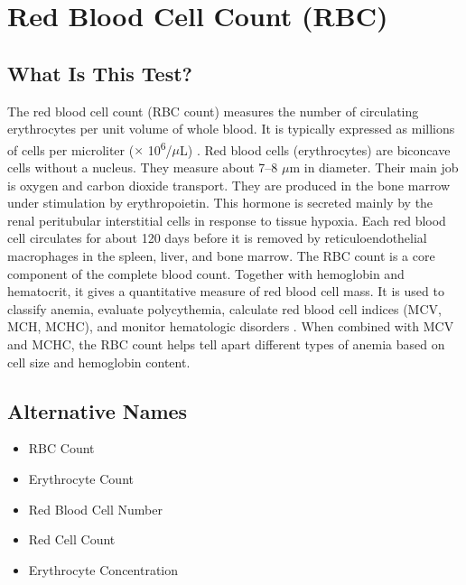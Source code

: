 \chapter{Red Blood Cell Count (RBC)}

\section*{What Is This Test?}
The red blood cell count (RBC count) measures the number of circulating erythrocytes per unit volume of whole blood. It is typically expressed as millions of cells per microliter ($\times$ 10\textsuperscript{6}/$\mu$L) \cite{tierney2023current}. Red blood cells (erythrocytes) are biconcave cells without a nucleus. They measure about 7--8 $\mu$m in diameter. Their main job is oxygen and carbon dioxide transport. They are produced in the bone marrow under stimulation by erythropoietin. This hormone is secreted mainly by the renal peritubular interstitial cells in response to tissue hypoxia. Each red blood cell circulates for about 120 days before it is removed by reticuloendothelial macrophages in the spleen, liver, and bone marrow. The RBC count is a core component of the complete blood count. Together with hemoglobin and hematocrit, it gives a quantitative measure of red blood cell mass. It is used to classify anemia, evaluate polycythemia, calculate red blood cell indices (MCV, MCH, MCHC), and monitor hematologic disorders \cite{kaushansky2021williams}. When combined with MCV and MCHC, the RBC count helps tell apart different types of anemia based on cell size and hemoglobin content.

\section*{Alternative Names}
\begin{itemize}
  \item RBC Count
  \item Erythrocyte Count
  \item Red Blood Cell Number
  \item Red Cell Count
  \item Erythrocyte Concentration
\end{itemize}
